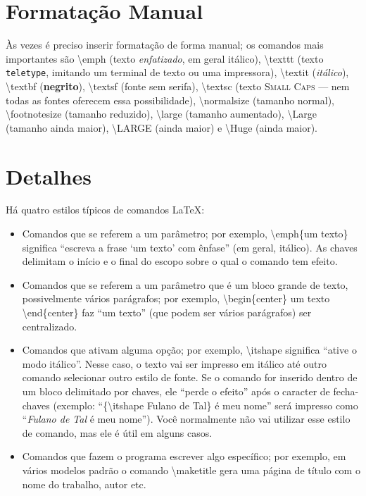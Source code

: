 \section{Formatação Manual}

Às vezes é preciso inserir formatação de forma manual; os comandos mais
importantes são \textsf{\textbackslash{}emph} (texto \emph{enfatizado}, em geral
itálico), \textsf{\textbackslash{}texttt} (texto \texttt{teletype}, imitando um
terminal de texto ou uma impressora), \textsf{\textbackslash{}textit}
(\textit{itálico}), \textsf{\textbackslash{}textbf} (\textbf{negrito}),
\textsf{\textbackslash{}textsf} (fonte \textsf{sem serifa}),
\textsf{\textbackslash{}textsc} (texto \textsc{Small Caps} --- nem todas
as fontes oferecem essa possibilidade),
\textsf{\textbackslash{}normalsize} (tamanho normal),
\textsf{\textbackslash{}footnotesize} (tamanho reduzido),
\textsf{\textbackslash{}large} (tamanho aumentado),
\textsf{\textbackslash{}Large} (tamanho ainda maior),
\textsf{\textbackslash{}LARGE} (ainda maior) e
\textsf{\textbackslash{}Huge} (ainda maior).

\section{Detalhes}

Há quatro estilos típicos de comandos \LaTeX{}:

\begin{itemize}
\item Comandos que se referem a um parâmetro; por exemplo,
\textsf{\textbackslash{}emph\{um texto\}} significa ``escreva a frase
`um texto' com ênfase'' (em geral, itálico). As chaves delimitam o início
e o final do escopo sobre o qual o comando tem efeito.

\item Comandos que se referem a um parâmetro que é um bloco grande de
texto, possivelmente vários parágrafos; por exemplo,
\textsf{\textbackslash{}begin\{center\} um texto
\textbackslash{}end\{center\}} faz ``um texto'' (que podem ser
vários parágrafos) ser centralizado.

\item Comandos que ativam alguma opção; por exemplo,
\textsf{\textbackslash{}itshape} significa ``ative o modo itálico''.
Nesse caso, o texto vai ser impresso em itálico até outro comando selecionar
outro estilo de fonte. Se o comando for inserido dentro de um bloco
delimitado por chaves, ele ``perde o efeito'' após o caracter de fecha-chaves
(exemplo: ``\textsf{\{\textbackslash{}itshape Fulano de Tal\} é meu nome}''
será impresso como ``\textit{Fulano de Tal} é meu nome''). Você normalmente
não vai utilizar esse estilo de comando, mas ele é útil em alguns casos.

\item Comandos que fazem o programa escrever algo específico; por exemplo,
em vários modelos padrão o comando \textsf{\textbackslash{}maketitle} gera
uma página de título com o nome do trabalho, autor etc.
\end{itemize}


